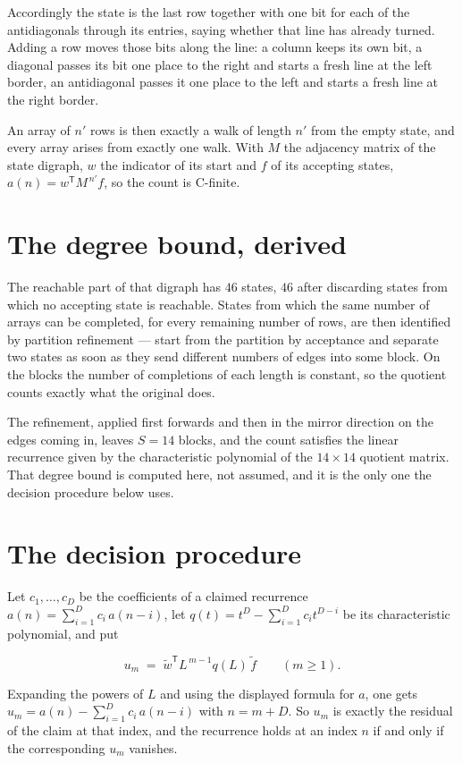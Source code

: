 \documentclass[11pt]{article}
\theoremstyle{definition}
\begin{document}
Accordingly the state is the last row together with one bit for each of the antidiagonals through its entries, saying whether that line has already turned. Adding a row moves those bits along the line: a column keeps its own bit, a diagonal passes its bit one place to the right and starts a fresh line at the left border, an antidiagonal passes it one place to the left and starts a fresh line at the right border.

An array of $n'$ rows is then exactly a walk of length $n'$ from the empty state, and every array arises from exactly one walk. With $M$ the adjacency matrix of the state digraph, $w$ the indicator of its start and $f$ of its accepting states, $a(n) = w^{\mathsf T}M^{\,n'}f$, so the count is C-finite.

\section{The degree bound, derived}

The reachable part of that digraph has $46$ states, $46$ after discarding states from which no accepting state is reachable. States from which the same number of arrays can be completed, for every remaining number of rows, are then identified by partition refinement --- start from the partition by acceptance and separate two states as soon as they send different numbers of edges into some block. On the blocks the number of completions of each length is constant, so the quotient counts exactly what the original does.

The refinement, applied first forwards and then in the mirror direction on the edges coming in, leaves $S = 14$ blocks, and the count satisfies the linear recurrence given by the characteristic polynomial of the $14 \times 14$ quotient matrix. That degree bound is computed here, not assumed, and it is the only one the decision procedure below uses.

\section{The decision procedure}

Let $c_1,\dots,c_D$ be the coefficients of a claimed recurrence $a(n) = \sum_{i=1}^{D} c_i\,a(n-i)$, let $q(t) = t^{D} - \sum_{i=1}^{D} c_i t^{D-i}$ be its characteristic polynomial, and put

\[u_m \;=\; \tilde w^{\mathsf T} L^{\,m-1} q(L)\,\tilde f \qquad (m \ge 1).\]

Expanding the powers of $L$ and using the displayed formula for $a$, one gets $u_m = a(n) - \sum_{i=1}^{D} c_i\,a(n-i)$ with $n = m + D$. So $u_m$ is exactly the residual of the claim at that index, and the recurrence holds at an index $n$ if and only if the corresponding $u_m$ vanishes.
\end{document}
